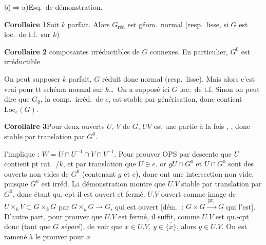 \documentclass[11pt,a4paper]{article}
\begin{document}
b)$\Rightarrow$a)\quad Esq.\ de démonstration.

\textbf{Corollaire 1}\quad Soit $k$ parfait. Alors $G_{\mathrm{réd}}$ est
géom.\ normal (resp.\ lisse, si $G$ est loc.\ de t.f.\ sur $k$)

\struck{\ill{}} \textbf{Corollaire 2}\quad \struck{\ill{}}  composantes
irréductibles de $G$  connexes. En particulier,
$G^0$ est irréductible 

On peut supposer $k$ parfait, $G$ réduit donc normal (resp.\ lisse). Mais
alors c'est vrai pour tt schéma normal  sur $k$…\ On a
supposé ici $G$ loc.\ de t.f.  \ill{} Sinon on peut dire
que $G_0$, la comp.\ irréd.\ de $e$, est stable par générisation, donc
contient $\mathrm{Loc}_e(G)$.

\textbf{Corollaire 3}\quad Pour deux ouverts $U$, $V$ de $G$,
\struck{\ill{}} $UV$ est une partie à la fois , , donc stable par
translation par $G^0$.

\struck{\ill{}} l'implique : $W = U \cap U^{-1} \cap V \cap V^{-1}$.
\struck{\ill{}} Pour prouver \struck{\ill{}} OPS par descente que $U$ contient
pt rat.\ /$k$, et par translation que $U \ni e$.
 \struck{\ill{}} or $gU \cap G^0$ et $U \cap G^0$ sont des
ouverts non vides de $G^0$ (contenant $g$ et $e$), donc ont une intersection
non vide, puisque $G^0$ est irréd.
La démonstration montre que $U.V$ stable par translation par $G^0$, donc
étant qu.-cpt il est  ouvert et fermé. \struck{\ill{}}
$U.V$ ouvert comme image de $U \times_k V \subset G \times_k G$ par
$G \times_k G \to G$, qui est ouvert [dém.\ : $G \times G \xrightarrow{\ \mathrm{pr}_1\ } G$ qui l'est]. D'autre part, pour prouver que $U.V$ est
fermé, il suffit, comme $U.V$ est \struck{\ill{}} qu.-cpt donc
 (tant que $G$ \emph{séparé}), \struck{\ill{}}
de voir que $x \in U.V$, $y \in \overline{\lbrace x\rbrace}$, alors $y \in U.V$.
On est ramené à \struck{\ill{}} le prouver pour $x$
\end{document}
